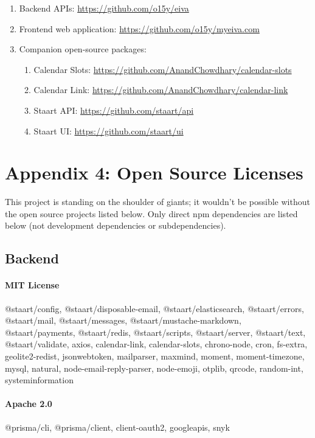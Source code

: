 \documentclass{article}
\begin{document}
\begin{enumerate}
	\item Backend APIs: \url{https://github.com/o15y/eiva}
	\item Frontend web application: \url{https://github.com/o15y/myeiva.com}
	\item Companion open-source packages:
	      \begin{enumerate}
	      	\item Calendar Slots: \url{https://github.com/AnandChowdhary/calendar-slots}
	      	\item Calendar Link: \url{https://github.com/AnandChowdhary/calendar-link}
	      	\item Staart API: \url{https://github.com/staart/api}
	      	\item Staart UI: \url{https://github.com/staart/ui}
	      \end{enumerate}
\end{enumerate}

\newpage

\section*{Appendix 4: Open Source Licenses}

This project is standing on the shoulder of giants; it wouldn't be possible without the open source projects listed below. Only direct npm dependencies are listed below (not development dependencies or subdependencies).

\subsection*{Backend}

\paragraph{MIT License} @staart/config, @staart/disposable-email, @staart/elasticsearch, @staart/errors, @staart/mail, @staart/messages, @staart/mustache-markdown, @staart/payments, @staart/redis, @staart/scripts, @staart/server, @staart/text, @staart/validate, axios, calendar-link, calendar-slots, chrono-node, cron, fs-extra, geolite2-redist, jsonwebtoken, mailparser, maxmind, moment, moment-timezone, mysql, natural, node-email-reply-parser, node-emoji, otplib, qrcode, random-int, systeminformation

\paragraph{Apache 2.0} @prisma/cli, @prisma/client, client-oauth2, googleapis, snyk
\end{document}
